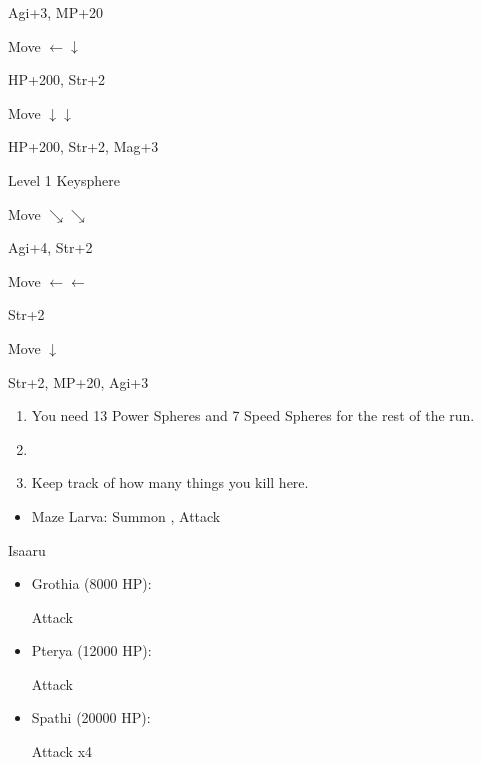 \begin{spheregrid}
\begin{itemize}
\begin{itemize}
\begin{multicols}{2}
                \item Agi+3, MP+20
                \item Move $\leftarrow\downarrow$
                \item HP+200, Str+2
                \item Move $\downarrow\downarrow$
                \item HP+200, Str+2, Mag+3
                \item Level 1 Keysphere
                \item Move $\searrow\searrow$
                \item Agi+4, Str+2
                \item Move $\leftarrow\leftarrow$
                \item Str+2
                \item Move $\downarrow$
                \item Str+2, MP+20, Agi+3
            \end{multicols}
        \end{itemize}
    \end{itemize}
\end{spheregrid}
\begin{enumerate}[resume]
    \item You need 13 Power Spheres and 7 Speed Spheres for the rest of the run.
    \item \save
    \item Keep track of how many things you kill here.
\end{enumerate}
\begin{encounters}
    \begin{itemize}
        \item Maze Larva: Summon \ixion, Attack
    \end{itemize}
\end{encounters}
\bothvfill
\winvfill
\lossvfill
\begin{battle}{Isaaru}
    \begin{itemize}
        \item Grothia (8000 HP):
        \begin{itemize}
            \summon{\bahamut}
            \bahamutf Attack
        \end{itemize}
        \item Pterya (12000 HP):
        \begin{itemize}
            \summon{\bahamut}
            \bahamutf Attack
        \end{itemize}
        \item Spathi (20000 HP):
        \begin{itemize}
            \summon{\ixion}
            \ixionf Attack x4
        \end{itemize}
    \end{itemize}
\end{battle}
